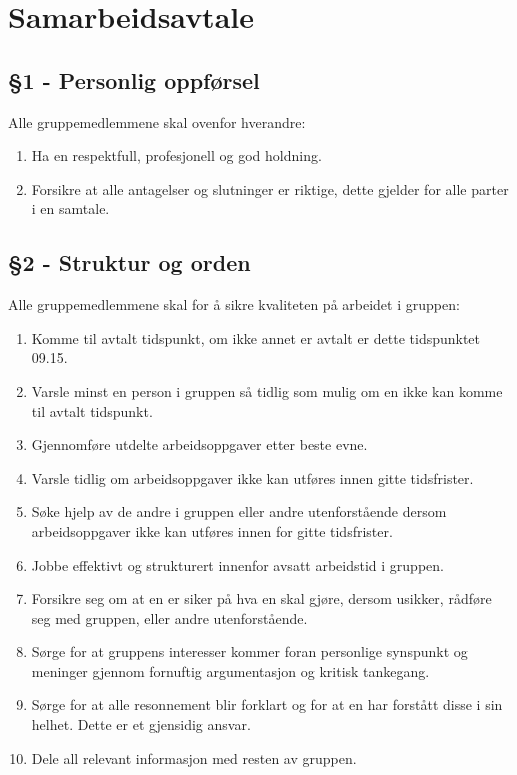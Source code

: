 \section*{Samarbeidsavtale}
\subsection*{§1 - Personlig oppførsel}
Alle gruppemedlemmene skal ovenfor hverandre:
\begin{enumerate}
\item Ha en respektfull, profesjonell og god holdning.
\item Forsikre at alle antagelser og slutninger er riktige, dette gjelder for alle parter i en samtale.
\end{enumerate}
\subsection*{§2 - Struktur og orden}
Alle gruppemedlemmene skal for å sikre kvaliteten på arbeidet i gruppen:
\begin{enumerate}
\item Komme til avtalt tidspunkt, om ikke annet er avtalt er dette tidspunktet 09.15.
\item Varsle minst en person i gruppen så tidlig som mulig om en ikke kan komme til avtalt tidspunkt.
\item Gjennomføre utdelte arbeidsoppgaver etter beste evne.
\item Varsle tidlig om arbeidsoppgaver ikke kan utføres innen gitte tidsfrister. 
\item Søke hjelp av de andre i gruppen eller andre utenforstående dersom arbeidsoppgaver ikke kan utføres innen for gitte tidsfrister.
\item Jobbe effektivt og strukturert innenfor avsatt arbeidstid i gruppen.
\item Forsikre seg om at en er siker på hva en skal gjøre, dersom usikker, rådføre seg med gruppen, eller andre utenforstående.
\item Sørge for at gruppens interesser kommer foran personlige synspunkt og meninger gjennom fornuftig argumentasjon og kritisk tankegang.
\item Sørge for at alle resonnement blir forklart og for at en har forstått disse i sin helhet. Dette er et gjensidig ansvar.
\item Dele all relevant informasjon med resten av gruppen.
\end{enumerate}
